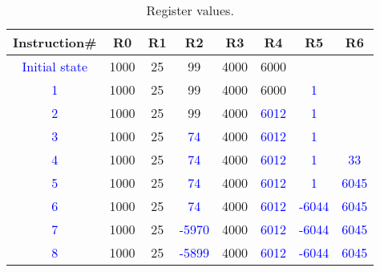 \documentclass[11pt]{article}
\newcommand{\answr}[1]{\textcolor{blue}{#1}}
\newcommand{\inst}[2]{\textcolor{blue}{{#1}{#2}}}
\begin{document}
\begin{table}[h]
\center
\begin{tabular}{|c|c|c|c|c|c|c|c|}
	\hline
	Instruction\# & R0 & R1 & R2 & R3 & R4 & R5 & R6 \\
	\hline
	\answr{Initial state} & 1000 & 25 & 99 & 4000 & 6000 & & \\
	\hline 
	\inst{1}{} & 1000 & 25 & 99 & 4000 & 6000 & \answr{1} & \\
	\hline
	\inst{2}{} & 1000 & 25 & 99 & 4000 & \answr{6012} & \answr{1} & \\
	\hline
	\inst{3}{} & 1000 & 25 & \answr{74} & 4000 & \answr{6012} & \answr{1} & \\
	\hline
	\inst{4}{} & 1000 & 25 & \answr{74} & 4000 & \answr{6012} & \answr{1} & \answr{33} \\
	\hline
	\inst{5}{} & 1000 & 25 & \answr{74} & 4000 & \answr{6012} & \answr{1} & \answr{6045} \\
	\hline
	\inst{6}{} & 1000 & 25 & \answr{74} & 4000 & \answr{6012} & \answr{-6044} & \answr{6045} \\
	\hline
	\inst{7}{} & 1000 & 25 & \answr{-5970} & 4000 & \answr{6012} & \answr{-6044} & \answr{6045} \\
	\hline
	\inst{8}{} & 1000 & 25 & \answr{-5899} & 4000 & \answr{6012} & \answr{-6044} & \answr{6045} \\
	\hline
\end{tabular}
\caption{Register values.}
\end{table}
\end{document}
